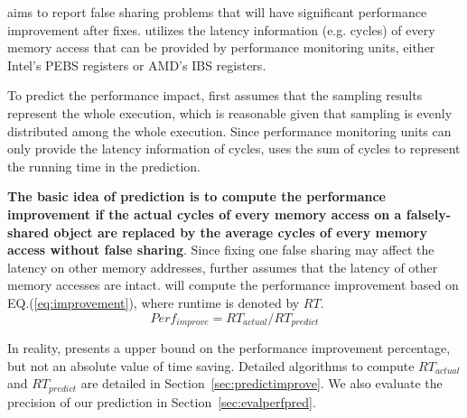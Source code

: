 \Cheetah{} aims to report false sharing problems that will have significant performance improvement after fixes. \Cheetah{} utilizes the latency information (e.g. cycles) of every memory access that can be provided by performance monitoring units, either Intel's PEBS registers or AMD's IBS registers. 

To predict the performance impact, \Cheetah{} first assumes that the sampling results represent the whole execution, which is reasonable given that sampling is evenly distributed among the whole execution. Since performance monitoring units can only provide the latency information of cycles, \Cheetah{} uses the sum of cycles to represent the running time in the prediction.  

{\bf The basic idea of prediction is to compute the performance improvement if the actual cycles of every memory access on a
falsely-shared object are replaced by the average cycles of every memory access without false sharing}. Since fixing one false sharing may affect the latency on other memory addresses, \cheetah{} further assumes that the latency of other memory accesses are intact. \cheetah{} will compute the performance improvement based on EQ.(\ref{eq:improvement}), where runtime is denoted by $RT$. 
\begin{equation}
\label{eq:improvement}
Perf_{improve}=RT_{actual}/RT_{predict}
\end{equation} 


In reality, \Cheetah{} presents a upper bound on the performance improvement percentage, but not an absolute value of time saving. 
Detailed algorithms to compute $RT_{actual}$ and $RT_{predict}$ are detailed in Section~\ref{sec:predictimprove}. We also evaluate the precision of our prediction in Section~\ref{sec:evalperfpred}.


